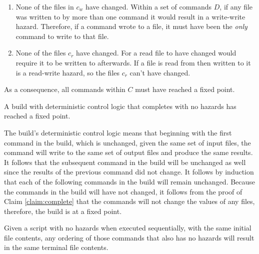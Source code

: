 \begin{enumerate}
\item None of the files in $c_w$ have changed. Within a set of commands $D$, if any file was written to by more than one command it would result in a write-write hazard. Therefore, if a command wrote to a file, it must have been the \emph{only} command to write to that file.
\item None of the files $c_r$ have changed. For a read file to have changed would require it to be written to afterwards. If a file is read from then written to it is a read-write hazard, so the files $c_r$ can't have changed.
\end{enumerate}

As a consequence, all commands within $C$ must have reached a fixed point.


\begin{claim} A build with deterministic control logic that completes with no hazards has reached a fixed point.  %
\label{sec:proof:no_rebuild}
\end{claim}


\proof The build's deterministic control logic means that beginning with the first command in the build, which is unchanged, given the same set of input files, the command will write to the same set of output files and produce the same results.  It follows that the subsequent command in the build will be unchanged as well since the results of the previous command did not change.  It follows by induction that each of the following commands in the build will remain unchanged.
Because the commands in the build will have not changed, it follows from the proof of Claim \ref{claim:complete} that the commands will not change the values of any files, therefore, the build is at a fixed point.

\begin{claim}
\label{sec:proof:reorder}

Given a script with no hazards when executed sequentially, with the same initial file contents, any ordering of those commands that also has no hazards will result in the same terminal file contents.
\end{claim}

